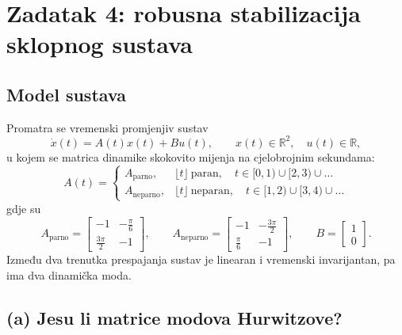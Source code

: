 \section{Zadatak 4: robusna stabilizacija sklopnog sustava}

\subsection{Model sustava}

Promatra se vremenski promjenjiv sustav
\begin{equation}
\dot{x}(t) = A(t) x(t) + B u(t), \qquad x(t) \in \mathbb{R}^2, \quad u(t) \in \mathbb{R},
\label{eq:sklopni_sustav}
\end{equation}
u kojem se matrica dinamike skokovito mijenja na cjelobrojnim sekundama:
\begin{equation}
A(t) =
\begin{cases}
A_{\mathrm{parno}}, & \lfloor t \rfloor \ \text{paran}, \quad t \in [0,1) \cup [2,3) \cup \dots \\[2pt]
A_{\mathrm{neparno}}, & \lfloor t \rfloor \ \text{neparan}, \quad t \in [1,2) \cup [3,4) \cup \dots
\end{cases}
\label{eq:zakon_prespajanja}
\end{equation}
gdje su
\begin{equation}
A_{\mathrm{parno}} = \begin{bmatrix} -1 & -\frac{\pi}{6} \\[2pt] \frac{3\pi}{2} & -1 \end{bmatrix}, \qquad
A_{\mathrm{neparno}} = \begin{bmatrix} -1 & -\frac{3\pi}{2} \\[2pt] \frac{\pi}{6} & -1 \end{bmatrix}, \qquad
B = \begin{bmatrix} 1 \\ 0 \end{bmatrix}.
\label{eq:matrice_modova}
\end{equation}
Između dva trenutka prespajanja sustav je linearan i vremenski invarijantan, pa ima dva dinamička moda.

\subsection{(a) Jesu li matrice modova Hurwitzove?}

